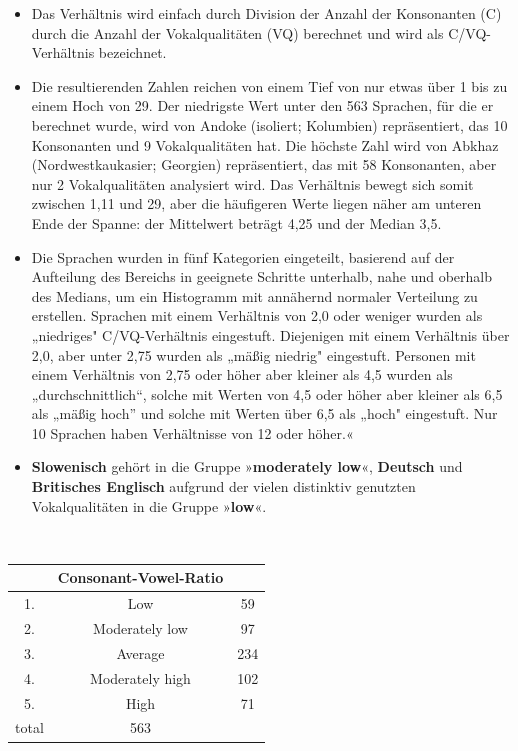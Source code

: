 \documentclass[
]{article}
\begin{document}
\begin{itemize}
\item
  Das Verhältnis wird einfach durch Division der Anzahl der
  Konsonanten (C) durch die Anzahl der Vokalqualitäten (VQ) berechnet
  und wird als C/VQ-Verhältnis bezeichnet.
\item
  Die resultierenden Zahlen reichen von einem Tief von nur etwas über
  1 bis zu einem Hoch von 29. Der niedrigste Wert unter den 563
  Sprachen, für die er berechnet wurde, wird von Andoke (isoliert;
  Kolumbien) repräsentiert, das 10 Konsonanten und 9 Vokalqualitäten
  hat. Die höchste Zahl wird von Abkhaz (Nordwestkaukasier; Georgien)
  repräsentiert, das mit 58 Konsonanten, aber nur 2 Vokalqualitäten
  analysiert wird. Das Verhältnis bewegt sich somit zwischen 1,11 und
  29, aber die häufigeren Werte liegen näher am unteren Ende der
  Spanne: der Mittelwert beträgt 4,25 und der Median 3,5.
\item
  Die Sprachen wurden in fünf Kategorien eingeteilt, basierend auf der
  Aufteilung des Bereichs in geeignete Schritte unterhalb, nahe und
  oberhalb des Medians, um ein Histogramm mit annähernd normaler
  Verteilung zu erstellen. Sprachen mit einem Verhältnis von 2,0 oder
  weniger wurden als „niedriges" C/VQ-Verhältnis eingestuft.
  Diejenigen mit einem Verhältnis über 2,0, aber unter 2,75 wurden als
  „mäßig niedrig" eingestuft. Personen mit einem Verhältnis von 2,75
  oder höher aber kleiner als 4,5 wurden als „durchschnittlich``,
  solche mit Werten von 4,5 oder höher aber kleiner als 6,5 als „mäßig
  hoch'' und solche mit Werten über 6,5 als „hoch" eingestuft. Nur 10
  Sprachen haben Verhältnisse von 12 oder höher.«
\item
  \textbf{Slowenisch} gehört in die Gruppe »\textbf{moderately low}«,
  \textbf{Deutsch} und \textbf{Britisches Englisch} aufgrund der vielen
  distinktiv genutzten Vokalqualitäten in die Gruppe »\textbf{low}«. ~
\end{itemize}

~

\begin{longtable}[]{@{}ccc@{}}
\toprule
~ & \textbf{Consonant-Vowel-Ratio} & ~ \\
\midrule
\endhead
1. & Low & 59 \\
2. & Moderately low & 97 \\
3. & Average & 234 \\
4. & Moderately high & 102 \\
5. & High & 71 \\
total & 563 & ~ \\
\bottomrule
\end{longtable}
\end{document}
